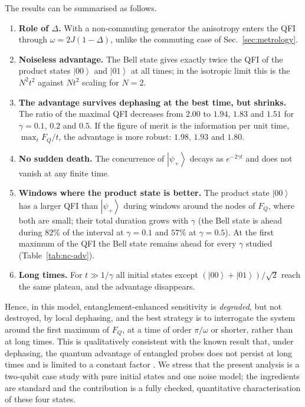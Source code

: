\documentclass[11pt,a4paper]{article}
\newcommand{\ket}[1]{\left|#1\right\rangle}
\newcommand{\FQ}{F_Q}
\begin{document}
The results can be summarised as follows.
\begin{enumerate}
  \item \textbf{Role of $\Delta$.} With a non-commuting generator the anisotropy enters the QFI through $\omega=2J(1-\Delta)$, unlike the commuting case of Sec.~\ref{sec:metrology}.
  \item \textbf{Noiseless advantage.} The Bell state gives exactly twice the QFI of the product states $\ket{00}$ and $\ket{01}$ at all times; in the isotropic limit this is the $N^2t^2$ against $Nt^2$ scaling for $N=2$.
  \item \textbf{The advantage survives dephasing at the best time, but shrinks.} The ratio of the maximal QFI decreases from $2.00$ to $1.94$, $1.83$ and $1.51$ for $\gamma=0.1$, $0.2$ and $0.5$. If the figure of merit is the information per unit time, $\max_t\FQ/t$, the advantage is more robust: $1.98$, $1.93$ and $1.80$.
  \item \textbf{No sudden death.} The concurrence of $\ket{\psi_+}$ decays as $e^{-2\gamma t}$ and does not vanish at any finite time.
  \item \textbf{Windows where the product state is better.} The product state $\ket{00}$ has a larger QFI than $\ket{\psi_+}$ during windows around the nodes of $\FQ$, where both are small; their total duration grows with $\gamma$ (the Bell state is ahead during $82\%$ of the interval at $\gamma=0.1$ and $57\%$ at $\gamma=0.5$). At the first maximum of the QFI the Bell state remains ahead for every $\gamma$ studied (Table~\ref{tab:nc-adv}).
  \item \textbf{Long times.} For $t\gg1/\gamma$ all initial states except $(\ket{00}+\ket{01})/\sqrt2$ reach the same plateau, and the advantage disappears.
\end{enumerate}
Hence, in this model, entanglement-enhanced sensitivity is \emph{degraded}, but not destroyed, by local dephasing, and the best strategy is to interrogate the system around the first maximum of $\FQ$, at a time of order $\pi/\omega$ or shorter, rather than at long times. This is qualitatively consistent with the known result that, under dephasing, the quantum advantage of entangled probes does not persist at long times and is limited to a constant factor \cite{Huelga1997,Escher2011,Demkowicz2012}. We stress that the present analysis is a two-qubit case study with pure initial states and one noise model; the ingredients are standard and the contribution is a fully checked, quantitative characterisation of these four states.
\end{document}

